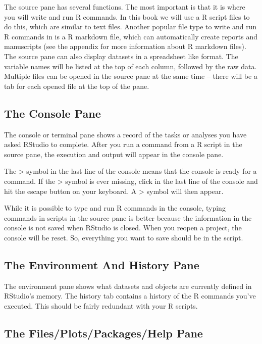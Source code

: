 \documentclass[
]{book}
\begin{document}
The source pane has several functions. The most important is that it is where you will write and run R commands. In this book we will use a R script files to do this, which are similar to text files. Another popular file type to write and run R commands in is a R markdown file, which can automatically create reports and manuscripts (see the appendix for more information about R markdown files). The source pane can also display datasets in a spreadsheet like format. The variable names will be listed at the top of each column, followed by the raw data. Multiple files can be opened in the source pane at the same time -- there will be a tab for each opened file at the top of the pane.

\hypertarget{the-console-pane}{%
\subsection{The Console Pane}\label{the-console-pane}}

The console or terminal pane shows a record of the tasks or analyses you have asked RStudio to complete. After you run a command from a R script in the source pane, the execution and output will appear in the console pane.

The \textgreater{} symbol in the last line of the console means that the console is ready for a command. If the \textgreater{} symbol is ever missing, click in the last line of the console and hit the escape button on your keyboard. A \textgreater{} symbol will then appear.

While it is possible to type and run R commands in the console, typing commands in scripts in the source pane is better because the information in the console is not saved when RStudio is closed. When you reopen a project, the console will be reset. So, everything you want to save should be in the script.

\hypertarget{the-environment-and-history-pane}{%
\subsection{The Environment And History Pane}\label{the-environment-and-history-pane}}

The environment pane shows what datasets and objects are currently defined in RStudio's memory. The history tab contains a history of the R commands you've executed. This should be fairly redundant with your R scripts.

\hypertarget{the-filesplotspackageshelp-pane}{%
\subsection{The Files/Plots/Packages/Help Pane}\label{the-filesplotspackageshelp-pane}}
\end{document}
